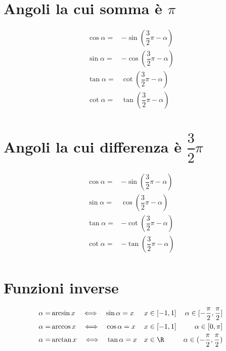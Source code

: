 \section{Angoli la cui somma è \texorpdfstring{$\pi$}{\textpi}}
\begin{align*}
\cos\alpha=&-\sin(\dfrac{3}{2}\pi-\alpha)\\
\sin\alpha=&-\cos(\dfrac{3}{2}\pi-\alpha)\\
\tan\alpha=&\cot(\dfrac{3}{2}\pi-\alpha)\\
\cot\alpha=&\tan(\dfrac{3}{2}\pi-\alpha)\\
\end{align*}
\section{Angoli la cui differenza è \texorpdfstring{$\dfrac{3}{2}\pi$}{3/2 \textpi}}
\begin{align*} 
\cos\alpha=&-\sin(\dfrac{3}{2}\pi-\alpha)\\
\sin\alpha=&\cos(\dfrac{3}{2}\pi-\alpha)\\
\tan\alpha=&-\cot(\dfrac{3}{2}\pi-\alpha)\\
\cot\alpha=&-\tan(\dfrac{3}{2}\pi-\alpha)\\
\end{align*}
\section{Funzioni inverse}\label{sec:funzioni-inverse}
\begin{align*}
\alpha=&\arcsin x\quad\Longleftrightarrow\quad\sin\alpha=x&& x\in[-1,1]&\alpha\in[-\dfrac{\pi}{2},\dfrac{\pi}{2}]\\
\alpha=&\arccos x\quad\Longleftrightarrow\quad\cos\alpha=x&&x\in[-1,1]&\alpha\in[0,\pi]\\
\alpha=&\arctan x\quad\Longleftrightarrow\quad\tan\alpha=x&& x\in\R
&\alpha\in(-\dfrac{\pi}{2},\dfrac{\pi}{2})
\end{align*}		